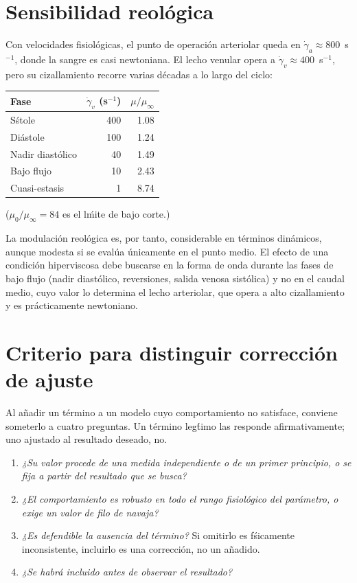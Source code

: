 \documentclass[11pt]{article}
\begin{document}
\section{Sensibilidad reol\'ogica}

Con velocidades fisiol\'ogicas, el punto de operaci\'on arteriolar queda en
$\dot\gamma_a\!\approx\!800$~s$^{-1}$, donde la sangre es casi newtoniana. El
lecho venular opera a $\dot\gamma_v\!\approx\!400$~s$^{-1}$, pero su
cizallamiento recorre varias d\'ecadas a lo largo del ciclo:

\begin{center}\small
\begin{tabular}{lrr}
\toprule
Fase & $\dot\gamma_v$ (s$^{-1}$) & $\mu/\mu_\infty$\\
\midrule
S\'stole & 400 & 1.08\\
Di\'astole & 100 & 1.24\\
Nadir diast\'olico & 40 & 1.49\\
Bajo flujo & 10 & 2.43\\
Cuasi-estasis & 1 & 8.74\\
\bottomrule
\end{tabular}
\end{center}

\noindent
($\mu_0/\mu_\infty=84$ es el l\'mite de bajo corte.)

\noindent
La modulaci\'on reol\'ogica es, por tanto, considerable en t\'erminos
din\'amicos, aunque modesta si se eval\'ua \'unicamente en el punto medio. El
efecto de una condici\'on hiperviscosa debe buscarse en la forma de onda
durante las fases de bajo flujo (nadir diast\'olico, reversiones, salida venosa
sist\'olica) y no en el caudal medio, cuyo valor lo determina el lecho
arteriolar, que opera a alto cizallamiento y es pr\'acticamente newtoniano.

\section{Criterio para distinguir correcci\'on de ajuste}

Al a\~nadir un t\'ermino a un modelo cuyo comportamiento no satisface, conviene
someterlo a cuatro preguntas. Un t\'ermino leg\'timo las responde
afirmativamente; uno ajustado al resultado deseado, no.

\begin{enumerate}
\item \emph{¿Su valor procede de una medida independiente o de un primer
principio, o se fija a partir del resultado que se busca?}
\item \emph{¿El comportamiento es robusto en todo el rango fisiol\'ogico del
par\'ametro, o exige un valor de filo de navaja?}
\item \emph{¿Es defendible la ausencia del t\'ermino?} Si omitirlo es
f\'sicamente inconsistente, incluirlo es una correcci\'on, no un a\~nadido.
\item \emph{¿Se habr\'a incluido antes de observar el resultado?}
\end{enumerate}
\end{document}
